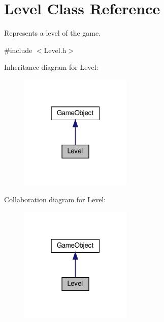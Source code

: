 \hypertarget{classLevel}{}\section{Level Class Reference}
\label{classLevel}


Represents a level of the game.  




{\ttfamily \#include $<$Level.\+h$>$}



Inheritance diagram for Level\+:
\nopagebreak
\begin{figure}[H]
\begin{center}
\leavevmode
\includegraphics[width=151pt]{classLevel__inherit__graph}
\end{center}
\end{figure}


Collaboration diagram for Level\+:
\nopagebreak
\begin{figure}[H]
\begin{center}
\leavevmode
\includegraphics[width=151pt]{classLevel__coll__graph}
\end{center}
\end{figure}
